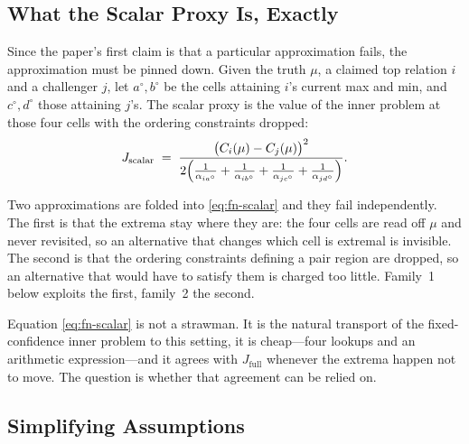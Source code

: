 \documentclass[conference]{IEEEtran}
\theoremstyle{definition}
\begin{document}
\subsection{What the Scalar Proxy Is, Exactly}
\label{sec:fn-proxydef}

Since the paper's first claim is that a particular approximation fails, the approximation
must be pinned down. Given the truth $\mu$, a claimed top relation $i$ and a challenger $j$,
let $a^{\circ},b^{\circ}$ be the cells attaining $i$'s current max and min, and
$c^{\circ},d^{\circ}$ those attaining $j$'s. The scalar proxy is the value of the inner
problem at those four cells with the ordering constraints dropped:
\begin{equation}
J_{\mathrm{scalar}}
\;=\;
\frac{\bigl(C_{i}(\mu)-C_{j}(\mu)\bigr)^{2}}
     {2\Bigl(\frac{1}{\alpha_{ia^{\circ}}}+\frac{1}{\alpha_{ib^{\circ}}}
            +\frac{1}{\alpha_{jc^{\circ}}}+\frac{1}{\alpha_{jd^{\circ}}}\Bigr)} .
\label{eq:fn-scalar}
\end{equation}

Two approximations are folded into \eqref{eq:fn-scalar} and they fail independently. The first
is that the extrema stay where they are: the four cells are read off $\mu$ and never
revisited, so an alternative that changes which cell is extremal is invisible. The second is
that the ordering constraints defining a pair region are dropped, so an alternative that
would have to satisfy them is charged too little. Family~1 below exploits the first, family~2
the second.

Equation \eqref{eq:fn-scalar} is not a strawman. It is the natural transport of the
fixed-confidence inner problem to this setting, it is cheap---four lookups and an arithmetic
expression---and it agrees with $J_{\mathrm{full}}$ whenever the extrema happen not to move.
The question is whether that agreement can be relied on.

\subsection{Simplifying Assumptions}
\end{document}
